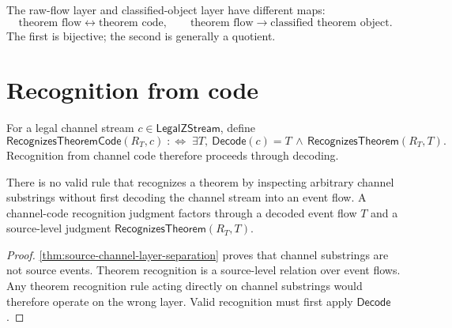 \begin{corollary}
\label{cor:theorem-generated-flow-object-layer-differ}
The raw-flow layer and classified-object layer have different maps:
$$
  \text{theorem flow}
  \leftrightarrow
  \text{theorem code},
  \qquad
  \text{theorem flow}
  \longrightarrow
  \text{classified theorem object}.
$$
The first is bijective; the second is generally a quotient.
\end{corollary}

\section{Recognition from code}
\label{sec:theorem-generated-recognition-from-code}

\begin{definition}
\label{def:theorem-generated-recognition-from-code}
For a legal channel stream $c\in\mathsf{LegalZStream}$, define
$$
  \mathsf{RecognizesTheoremCode}(R_T,c)
  \;:\Longleftrightarrow\;
  \exists T,\ \mathsf{Decode}(c)=T \,\wedge\, \mathsf{RecognizesTheorem}(R_T,T).
$$
Recognition from channel code therefore proceeds through decoding.
\end{definition}

\begin{proposition}
\label{prop:theorem-generated-no-channel-substring-recognition}
There is no valid rule that recognizes a theorem by inspecting arbitrary channel substrings without first decoding the channel stream into an event flow. A channel-code recognition judgment factors through a decoded event flow $T$ and a source-level judgment $\mathsf{RecognizesTheorem}(R_T,T)$.
\end{proposition}

\begin{proof}
\autoref{thm:source-channel-layer-separation} proves that channel substrings are not source events. Theorem recognition is a source-level relation over event flows. Any theorem recognition rule acting directly on channel substrings would therefore operate on the wrong layer. Valid recognition must first apply $\mathsf{Decode}$.
\end{proof}

